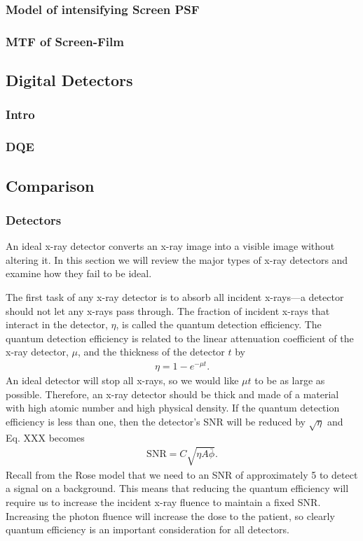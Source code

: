 \documentclass[mphy386-notes.tex]{subfiles}
\begin{document}
\subsubsection{Model of intensifying Screen PSF}
\subsubsection{MTF of Screen-Film}
\subsection{Digital Detectors}
\subsubsection{Intro}
\subsubsection{DQE}
\subsection{Comparison}
\subsubsection{Detectors}
An ideal x-ray detector converts an x-ray image into a visible image without
altering it. In this section we will review the major types of x-ray detectors
and examine how they fail to be ideal.

The first task of any x-ray detector is to absorb all incident x-rays---a
detector should not let any x-rays pass through. The fraction of incident x-rays
that interact in the detector, $\eta$, is called the quantum detection
efficiency. The quantum detection efficiency is related to the linear
attenuation coefficient of the x-ray detector, $\mu$, and the thickness of the detector $t$ by
\begin{align}
  \eta = 1 - e^{-\mu t}. 
\end{align}
An ideal detector will stop all x-rays, so we would like $\mu t$ to be as large
as possible. Therefore, an x-ray detector should be thick and made of a material
with high atomic number and high physical density. If the quantum detection
efficiency is less than one, then the detector's SNR will be reduced by
$\sqrt{\eta}$ and Eq. XXX becomes
\begin{align}
  \text{SNR} = C\sqrt{\eta A\bar{\phi}}.
\end{align}
Recall from the Rose model that we need to an SNR of approximately 5 to detect a
signal on a background. This means that reducing the quantum efficiency will
require us to increase the incident x-ray fluence to maintain a fixed SNR.
Increasing the photon fluence will increase the dose to the patient, so clearly
quantum efficiency is an important consideration for all detectors.
\end{document}
